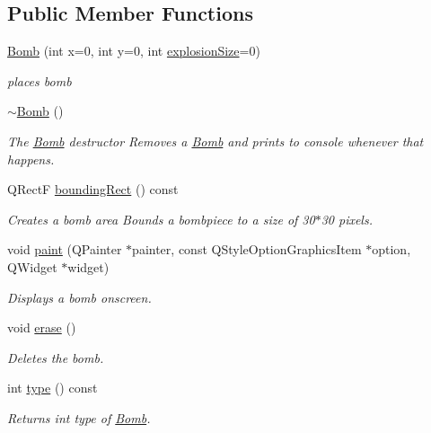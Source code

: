 \subsection*{Public Member Functions}
\begin{DoxyCompactItemize}
\item 
\hyperlink{class_bomb_ada9d05fb30c035691190e80d1d0a1c7f}{Bomb} (int x=0, int y=0, int \hyperlink{class_bomb_a7576bf99d4bcfbc7dda365511ca2fcd7}{explosion\-Size}=0)
\begin{DoxyCompactList}\small\item\em places bomb \end{DoxyCompactList}\item 
\hyperlink{class_bomb_acbb47327cfb2fa429887774ef3597965}{$\sim$\-Bomb} ()
\begin{DoxyCompactList}\small\item\em The \hyperlink{class_bomb}{Bomb} destructor Removes a \hyperlink{class_bomb}{Bomb} and prints to console whenever that happens. \end{DoxyCompactList}\item 
Q\-Rect\-F \hyperlink{class_bomb_ad047941e8f1413a061f98f460dcea22a}{bounding\-Rect} () const 
\begin{DoxyCompactList}\small\item\em Creates a bomb area Bounds a bombpiece to a size of 30$\ast$30 pixels. \end{DoxyCompactList}\item 
void \hyperlink{class_bomb_ab8e930cc66f5d3f41e8a02f3d0d8185e}{paint} (Q\-Painter $\ast$painter, const Q\-Style\-Option\-Graphics\-Item $\ast$option, Q\-Widget $\ast$widget)
\begin{DoxyCompactList}\small\item\em Displays a bomb onscreen. \end{DoxyCompactList}\item 
void \hyperlink{class_bomb_aacd1b797985f1f77e896c69a067126ec}{erase} ()
\begin{DoxyCompactList}\small\item\em Deletes the bomb. \end{DoxyCompactList}\item 
int \hyperlink{class_bomb_aa555383c82ad5ea7155e8fccbd9566a8}{type} () const 
\begin{DoxyCompactList}\small\item\em Returns int type of \hyperlink{class_bomb}{Bomb}. \end{DoxyCompactList}\end{DoxyCompactItemize}
